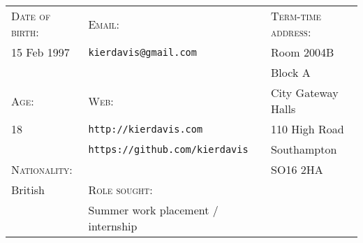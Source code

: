 \hrulefill
\vspace{1.1em}

{
\newcommand{\h}[1]{\textsc{#1}:}
\newcommand{\n}[1]{\hspace{.8em} #1}
\begin{tabu} to \textwidth {X[1,l] X[2,l] X[1.5,l]}
    \h{Date of birth}  & \h{Email}                                 & \h{Term-time address}  \\
    \n{15 Feb 1997}    & \n{\texttt{kierdavis@gmail.com}}          & \n{Room 2004B}         \\
                       &                                           & \n{Block A}            \\
    \h{Age}            & \h{Web}                                   & \n{City Gateway Halls} \\
    \n{18}             & \n{\texttt{http://kierdavis.com}}         & \n{110 High Road}      \\
                       & \n{\texttt{https://github.com/kierdavis}} & \n{Southampton}        \\
    \h{Nationality}    &                                           & \n{SO16 2HA}           \\
    \n{British}        & \h{Role sought}                           &                        \\
                       & \n{Summer work placement / internship}    &                        \\
\end{tabu}
}

\hrulefill
